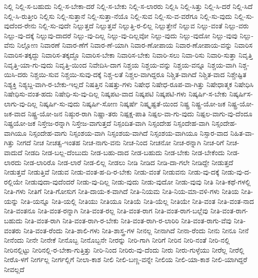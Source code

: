 {ನಿಲ್ಲಿ
ನಿಲ್ಲಿ-ಸ-ಬಹುದು
ನಿಲ್ಲಿ-ಸ-ಬೇಕಾ-ದರೆ
ನಿಲ್ಲಿ-ಸ-ಬೇಕು
ನಿಲ್ಲಿ-ಸ-ಲಾರರು
ನಿಲ್ಲಿಸಿ
ನಿಲ್ಲಿ-ಸಿತ್ತು
ನಿಲ್ಲಿ-ಸಿ-ದರೆ
ನಿಲ್ಲಿ-ಸಿದೆ
ನಿಲ್ಲಿ-ಸಿ-ರುತ್ತೀರಿ
ನಿಲ್ಲಿಸು
ನಿಲ್ಲಿ-ಸುತ್ತಾನೆ
ನಿಲ್ಲಿ-ಸುತ್ತಾ-ನೆಯೊ
ನಿಲ್ಲಿ-ಸುವ
ನಿಲ್ಲಿ-ಸು-ವ-ವರೆಗೂ
ನಿಲ್ಲಿ-ಸು-ವುದು
ನಿಲ್ಲಿ-ಸು-ವುದೆಂದ-ರೇನು
ನಿಲ್ಲಿ-ಸು-ವುದೇ
ನಿಲ್ಲುತ್ತದೆ
ನಿಲ್ಲುತ್ತವೆ
ನಿಲ್ಲುತ್ತಿ-ರ-ಲಿಲ್ಲ
ನಿಲ್ಲುತ್ತೇನೆ
ನಿಲ್ಲುವ
ನಿಲ್ಲು-ವಂತೆ
ನಿಲ್ಲು-ವರು
ನಿಲ್ಲು-ವು-ದಕ್ಕೆ
ನಿಲ್ಲುವು-ದಾದರೆ
ನಿಲ್ಲು-ವು-ದಿಲ್ಲ
ನಿಲ್ಲು-ವು-ದಿಲ್ಲವೋ
ನಿಲ್ಲು-ವುದು
ನಿಲ್ಲು-ವುದೋ
ನಿಲ್ಲು-ವುವು
ನಿಲ್ಲು-ವೆನು
ನಿಲ್ಲೋಣ
ನಿವಾರಣೆ
ನಿವಾರ-ಣೆಗೆ
ನಿವಾರ-ಣೆ-ಯಾಗಿ
ನಿವಾರ-ಣೋಪಾಯ
ನಿವಾರ-ಣೋಪಾಯ-ವನ್ನು
ನಿವಾರಿಸ
ನಿವಾರಿಸ-ತಕ್ಕದ್ದು
ನಿವಾರಿಸ-ತಕ್ಕದ್ದೊ
ನಿವಾರಿಸ-ಬೇಕಾ
ನಿವಾರಿಸ-ಬೇಕು
ನಿವಾರಿ-ಸಲು
ನಿವಾ-ರಿಸು
ನಿವಾರಿ-ಸುತ್ತಾ
ನಿವೃತ್ತಿ
ನಿವೃತ್ತಿ-ಯಾ-ಗು-ವುದು
ನಿವೃತ್ತಿ-ಯಿಂದ
ನಿವೇದಿಸಿ-ದಾಗ
ನಿಶ್ಚಯ
ನಿಶ್ಚಯ-ವನ್ನು
ನಿಶ್ಚಯ-ವನ್ನೂ
ನಿಶ್ಚಯ-ವಾಗಿ
ನಿಶ್ಚ-ಯಿಸಿ-ದರು
ನಿಶ್ಚಯಿ-ಸುವ
ನಿಶ್ಚಯಿ-ಸುವು-ದಕ್ಕೆ
ನಿಶ್ಚ-ಲತೆ
ನಿಶ್ಚಲ-ವಾಗಿದ್ದರೂ
ನಿಶ್ಚಿತ-ವಾಗಿದೆ
ನಿಶ್ಚಿತ-ವಾದ
ನಿಶ್ಚೇಷ್ಟಿತ
ನಿಶ್ಯಕ್ತಿ
ನಿಶ್ಯಬ್ದ-ವಾಗಿ-ರ-ಬೇಕು-ಇಲ್ಲದೆ
ನಿಷತ್ತಿನ
ನಿಷತ್ತು-ಗಳು
ನಿಷೇಧ
ನಿಷೇಧ-ರೂಪ-ವಾ-ಗಿತ್ತು
ನಿಷೇಧಾತ್ಮಕ
ನಿಷೇಧಿಸಿ
ನಿಷೇಧಿಸು-ವಂತ-ಹದು
ನಿಷೇಧಿ-ಸು-ವು-ದಿಲ್ಲ
ನಿಷ್ಕಪಟ-ವಾದ
ನಿಷ್ಕಪಟಿ
ನಿಷ್ಕಪಟಿ-ಗಳು
ನಿಷ್ಕರ್ಷಿ-ಸ-ಬೇಕು
ನಿಷ್ಕರ್ಷಿಸ-ಲಾಗು-ವು-ದಿಲ್ಲ
ನಿಷ್ಕರ್ಷಿ-ಸು-ವುದು
ನಿಷ್ಕರ್ಷಿ-ಸೋಣ
ನಿಷ್ಕರ್ಷೆ
ನಿಷ್ಕೃಷ್ಟತೆ-ಯಿಂದ
ನಿಷ್ಟ್ರ
ನಿಷ್ಟ್ರ-ಯೋ-ಜಕ
ನಿಷ್ಟ್ರ-ಯೋ-ಜಕ-ವಾದ
ನಿಷ್ಟ್ರ-ಯೋ-ಜನ
ನಿಷ್ಠುರ-ರಾಗಿ
ನಿಷ್ಣಾ-ತರು
ನಿಷ್ಪಕ್ಷ-ಪಾತಿ
ನಿಷ್ಪಲ-ವಾ-ಗು-ವುದು
ನಿಷ್ಪಲ-ವಾಗು-ವು-ದೆಂದೂ
ನಿಷ್ಪ್ರಯೋ-ಜಕ
ನಿಸ್ತೇಜ-ರನ್ನಾಗಿ
ನಿಸ್ತೇಜ-ವಾಗುತ್ತದೆ
ನಿಸ್ಪಂದಿತ-ವಾಗಿ
ನಿಸ್ಸಂದೇಹ
ನಿಸ್ಸಂದೇಹ-ವಾಗಿ
ನಿಸ್ಸಂದೇಹ-ವಾಗಿಯೂ
ನಿಸ್ಸಂದೇಹ-ವಾಗು
ನಿಸ್ಸಂಶಯ-ವಾಗಿ
ನಿಸ್ಸಂಶಯ-ವಾಗಿದೆ
ನಿಸ್ಸಂಶಯ-ವಾಗಿಯೂ
ನಿಸ್ಸಾರ-ವಾದ
ನಿಹಿತ-ವಾ-ಗಿತ್ತು
ನೀಗದೆ
ನೀಚ
ನೀಚತ್ವ-ಇಂತಹ
ನೀಚ-ನಾಗು-ವನು
ನೀಚ-ನಿಂದ
ನೀಚನೋ
ನೀಚ-ರನ್ನಾಗಿ
ನೀಚ-ರಿಗೆ
ನೀಚ-ವಾದುದೆ
ನೀಡದಿ
ನೀಡ-ಬಲ್ಲ-ದೆಂಬುದು
ನೀಡ-ಬಹು-ದಾದ
ನೀಡ-ಬಹುದು
ನೀಡ-ಬೇಕು
ನೀಡ-ಬೇಕೆಂದು
ನೀಡ-ಲಾರದು
ನೀಡ-ಲಾರಿರೊ
ನೀಡ-ಲಾರೆ
ನೀಡ-ಲಿಲ್ಲ
ನೀಡಲು
ನೀಡಿ
ನೀಡಿದ
ನೀಡಿ-ದಾ-ಗಲೇ
ನೀಡಿದ್ದೇ
ನೀಡುತ್ತದೆ
ನೀಡುತ್ತವೆ
ನೀಡುತ್ತಿವೆ
ನೀಡುವ
ನೀಡು-ವಂತ-ಹ-ದಿ-ರ-ಬೇಕು
ನೀಡು-ವಂತೆ
ನೀಡುವನು
ನೀಡು-ವು-ದಕ್ಕೆ
ನೀಡು-ವು-ದ-ರಲ್ಲಿಯೇ
ನೀಡುವುದಾ-ವುದೆಂದರೆ
ನೀಡು-ವು-ದಿಲ್ಲ
ನೀಡು-ವುದು
ನೀಡು-ವುದೋ
ನೀಡು-ವುವು
ನೀತಿ
ನೀತಿ-ಕಥೆ-ಗಳಲ್ಲಿ
ನೀತಿ-ಗಳು
ನೀತಿಗೆ
ನೀತಿ-ಗೋಸುಗ
ನೀತಿ-ದಾಯ-ಕ-ವಾಗಿದೆ
ನೀತಿ-ನಿಯಮ
ನೀತಿ-ನಿಯ-ಮಾ-ವಳಿ-ಗಳು
ನೀತಿಯ
ನೀತಿ-ಯನ್ನು
ನೀತಿ-ಯನ್ನೂ
ನೀತಿ-ಯಲ್ಲಿ
ನೀತಿಯು
ನೀತಿಯೂ
ನೀತಿಯೆ
ನೀತಿ-ಯೆಲ್ಲ
ನೀತಿಯೇ
ನೀತಿ-ವಂತ
ನೀತಿ-ವಂತ-ನಾದ
ನೀತಿ-ವಂತನೂ
ನೀತಿ-ವಂತ-ರನ್ನಾಗಿ
ನೀತಿ-ವಂತ-ರಲ್ಲ
ನೀತಿ-ವಂತ-ರಾಗ
ನೀತಿ-ವಂತ-ರಾಗ-ಬಲ್ಲೆವು
ನೀತಿ-ವಂತ-ರಾಗ-ಬಹುದು
ನೀತಿ-ವಂತ-ರಾಗಿ
ನೀತಿ-ವಂತ-ರಾಗಿ-ರ-ಬೇಕು
ನೀತಿ-ವಂತ-ರಾಗಿ-ರ-ಲಾರಿರಿ
ನೀತಿ-ವಂತ-ರಾಗು-ವೆವು
ನೀತಿ-ವಂತರು
ನೀತಿ-ವಂತ-ರೆಂದು
ನೀತಿ-ಶಾಲಿ-ಗಳು
ನೀತಿ-ಶಾಸ್ತ್ರ-ಗಳ
ನೀನಲ್ಲ
ನೀನಾಗಿದೆ
ನೀನಾ-ರೆಂದು
ನೀನು
ನೀನೂ
ನೀನೆ
ನೀನೆಂದು
ನೀನೇ
ನೀನೇಕೆ
ನೀನೊಬ್ಬ
ನೀನೊಬ್ಬನೇ
ನೀರನ್ನು
ನೀರಿ-ಗಾಗಿ
ನೀರಿಗೆ
ನೀರಿನ
ನೀರಿ-ನಂತೆ
ನೀರಿ-ನಲ್ಲಿ
ನೀರಿನಲ್ಲಿಟ್ಟು
ನೀರಿನಲ್ಲಿ-ರ-ಬೇಕಾ-ಗುತ್ತಿತ್ತು
ನೀರಿ-ನಿಂದ
ನೀರಿರು-ವು-ದೆಂದು
ನೀರು
ನೀರು-ಗುಳ್ಳೆಯು
ನೀರೆಲ್ಲ
ನೀರೆಲ್ಲಿ
ನೀರೊ-ಳಗೆ
ನೀರ್ಗಲ್ಲ
ನೀರ್ಗಲ್ಲಿಗೆ
ನೀಲಾ-ಕಾಶ
ನೀಲಿ
ನೀಲಿ-ಬಣ್ಣ-ವನ್ನೇ
ನೀಲಿಯ
ನೀಲಿ-ಯಾ-ಕಾಶ
ನೀಲಿ-ಯಾಗಿದ್ದರೆ
ನೀವಲ್ಲದೆ
}
